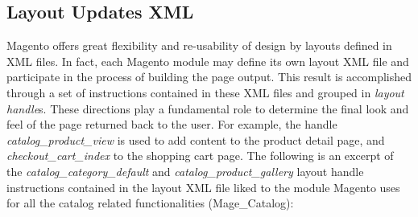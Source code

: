 \subsection{Layout Updates XML}

Magento offers great flexibility and re-usability of design by layouts defined in XML files. In fact, each Magento module may define its own layout XML file and participate in the process of building the page output. This result is accomplished through a set of instructions contained in these XML files and grouped in \textit{layout handle}s. These directions play a fundamental role to determine the final look and feel of the page returned back to the user.
For example, the handle \textit{catalog\_product\_view} is used to add content to the product detail page, and \textit{checkout\_cart\_index} to the shopping cart page. The following is an excerpt of the \textit{catalog\_category\_default} and  \textit{catalog\_product\_gallery} layout handle instructions contained in the layout XML file liked to the module Magento uses for all the catalog related functionalities (Mage\_Catalog):


